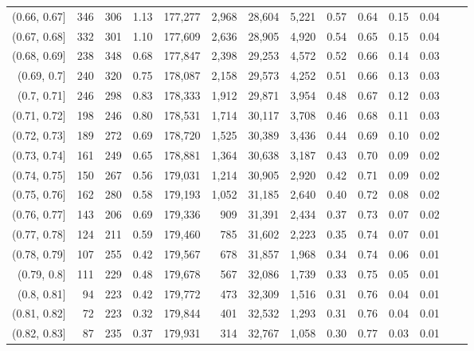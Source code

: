\begin{tabular}{rrrrrrrrrrrrrr}
(0.66, 0.67]   &    346 &  306 &    1.13 &  177,277 &    2,968 &  28,604 &   5,221 &  0.57 &  0.64 &  0.15 &      0.04 \\
(0.67, 0.68]   &    332 &  301 &    1.10 &  177,609 &    2,636 &  28,905 &   4,920 &  0.54 &  0.65 &  0.15 &      0.04 \\
(0.68, 0.69]   &    238 &  348 &    0.68 &  177,847 &    2,398 &  29,253 &   4,572 &  0.52 &  0.66 &  0.14 &      0.03 \\
(0.69, 0.7]    &    240 &  320 &    0.75 &  178,087 &    2,158 &  29,573 &   4,252 &  0.51 &  0.66 &  0.13 &      0.03 \\
(0.7, 0.71]    &    246 &  298 &    0.83 &  178,333 &    1,912 &  29,871 &   3,954 &  0.48 &  0.67 &  0.12 &      0.03 \\
(0.71, 0.72]   &    198 &  246 &    0.80 &  178,531 &    1,714 &  30,117 &   3,708 &  0.46 &  0.68 &  0.11 &      0.03 \\
(0.72, 0.73]   &    189 &  272 &    0.69 &  178,720 &    1,525 &  30,389 &   3,436 &  0.44 &  0.69 &  0.10 &      0.02 \\
(0.73, 0.74]   &    161 &  249 &    0.65 &  178,881 &    1,364 &  30,638 &   3,187 &  0.43 &  0.70 &  0.09 &      0.02 \\
(0.74, 0.75]   &    150 &  267 &    0.56 &  179,031 &    1,214 &  30,905 &   2,920 &  0.42 &  0.71 &  0.09 &      0.02 \\
(0.75, 0.76]   &    162 &  280 &    0.58 &  179,193 &    1,052 &  31,185 &   2,640 &  0.40 &  0.72 &  0.08 &      0.02 \\
(0.76, 0.77]   &    143 &  206 &    0.69 &  179,336 &      909 &  31,391 &   2,434 &  0.37 &  0.73 &  0.07 &      0.02 \\
(0.77, 0.78]   &    124 &  211 &    0.59 &  179,460 &      785 &  31,602 &   2,223 &  0.35 &  0.74 &  0.07 &      0.01 \\
(0.78, 0.79]   &    107 &  255 &    0.42 &  179,567 &      678 &  31,857 &   1,968 &  0.34 &  0.74 &  0.06 &      0.01 \\
(0.79, 0.8]    &    111 &  229 &    0.48 &  179,678 &      567 &  32,086 &   1,739 &  0.33 &  0.75 &  0.05 &      0.01 \\
(0.8, 0.81]    &     94 &  223 &    0.42 &  179,772 &      473 &  32,309 &   1,516 &  0.31 &  0.76 &  0.04 &      0.01 \\
(0.81, 0.82]   &     72 &  223 &    0.32 &  179,844 &      401 &  32,532 &   1,293 &  0.31 &  0.76 &  0.04 &      0.01 \\
(0.82, 0.83]   &     87 &  235 &    0.37 &  179,931 &      314 &  32,767 &   1,058 &  0.30 &  0.77 &  0.03 &      0.01 \\

\end{tabular}
